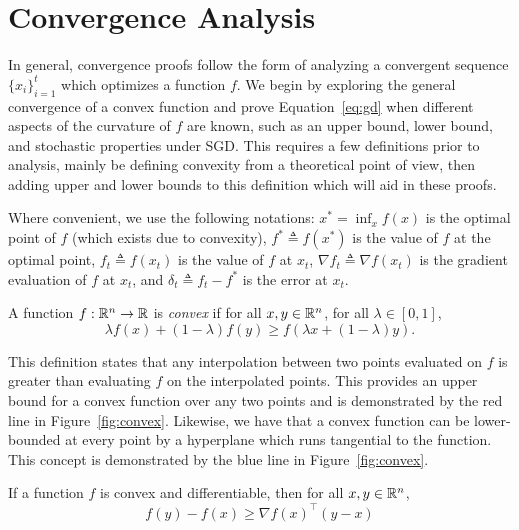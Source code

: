 \section{Convergence Analysis}

In general, convergence proofs follow the form of analyzing a convergent
sequence $\{x_i\}_{i=1}^t$ which optimizes a function $f$. We begin by exploring the
general convergence of a convex function and prove Equation~\ref{eq:gd} when
different aspects of the curvature of $f$ are known, such as an upper bound,
lower bound, and stochastic properties under SGD.  This requires a few
definitions prior to analysis, mainly be defining convexity from a theoretical
point of view, then adding upper and lower bounds to this definition which will
aid in these proofs. 

Where convenient, we use the following notations: $x^* = \inf_x f(x)$ is the
optimal point of $f$ (which exists due to convexity), $f^* \triangleq f(x^*)$ is
the value of $f$ at the optimal point, $f_t \triangleq f(x_t)$ is the
value of $f$ at $x_t$, $\nabla f_t \triangleq \nabla f(x_t)$ is the
gradient evaluation of $f$ at $x_t$, and $\delta_t \triangleq f_t - f^*$ is the
error at $x_t$.
\begin{definition}
    A function $f: \mathbb R^n \rightarrow \mathbb R$ is \emph{convex} if for all $x, y \in
    \mathbb R^n$, for all $\lambda \in [0, 1]$,
    \begin{equation}
        \label{eq:convex}
        \lambda f(x) + (1 - \lambda)f(y) \geq f(\lambda x + (1 - \lambda)y).
    \end{equation}
\end{definition}

This definition states that any interpolation between two points
evaluated on $f$ is greater than evaluating $f$ on the interpolated points. This
provides an upper bound for a convex function over any two points and is
demonstrated by the red line in Figure~\ref{fig:convex}. Likewise, we
have that a convex function can be lower-bounded at every point by a hyperplane
which runs tangential to the function.
This concept is demonstrated by the blue line in Figure~\ref{fig:convex}. 

\begin{lemma}
    \label{lem:convex_bound}
    If a function $f$ is convex and differentiable, then for all $x, y \in \mathbb R^n$,
    \begin{equation}
        f(y) - f(x) \geq \nabla {f(x)}^\intercal (y - x)
    \end{equation}
\end{lemma}

